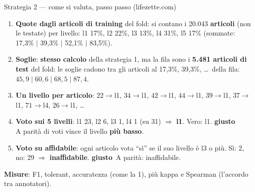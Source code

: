 \documentclass[aspectratio=169]{beamer}
\newcommand{\hl}[1]{\textbf{#1}}
\newcommand{\si}{\textcolor{verde}{\textbf{giusto}}}
\begin{document}
\begin{frame}{Strategia 2 --- come si valuta, passo passo (lifezette.com)}
  \small
  \begin{enumerate}
    \setlength\itemsep{0.45em}
    \item \hl{Quote dagli articoli di training} del fold: si contano i 20.043 \hl{articoli} (non le testate) per livello:
          l1 17\%, l2 22\%, l3 13\%, l4 31\%, l5 17\% (sommate: 17,3\% $\mid$ 39,3\% $\mid$ 52,1\% $\mid$ 83,5\%).
    \item \hl{Soglie}: \hl{stesso calcolo} della strategia 1, ma la fila sono i \hl{5.481 articoli di test} del fold: le soglie
          cadono tra gli articoli al 17,3\%, 39,3\%, \ldots\ della fila: $45{,}9 \mid 60{,}6 \mid 68{,}5 \mid 87{,}4$.
    \item \hl{Un livello per articolo}: $22{\to}$l1, $34{\to}$l1, $42{\to}$l1, $44{\to}$l1, $39{\to}$l1, $37{\to}$l1,
          $71{\to}$l4, $26{\to}$l1, \ldots
    \item \hl{Voto sui 5 livelli}: l1 23, l2 6, l3 1, l4 1 (su 31) $\Rightarrow$ \textbf{l1}. Vero: l1. \si\\
          A parit\`a di voti vince il livello \hl{pi\`u basso}.
    \item \hl{Voto su affidabile}: ogni articolo vota ``s\`i'' se il suo livello \`e l3 o pi\`u. S\`i: 2, no: 29
          $\Rightarrow$ \textbf{inaffidabile}. \si\ A parit\`a: inaffidabile.
  \end{enumerate}
  \vspace{0.2em}
  \raggedright
  \hl{Misure}: F1, tolerant, accuratezza (come la 1), pi\`u kappa e Spearman (l'accordo tra annotatori).
\end{frame}
\end{document}
